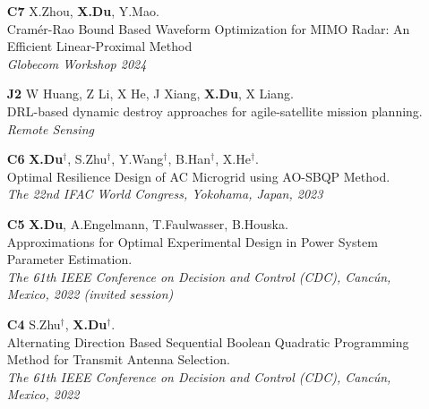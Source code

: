 \documentclass[paper=a4,fontsize=11pt]{scrartcl} %
\begin{document}
\begin{itemize}
		
			\item [\textbf{C7}]   {X.Zhou, \textbf{X.Du},   Y.Mao. \\
				{Cram\'er-Rao Bound Based Waveform Optimization for MIMO Radar: An Efficient Linear-Proximal Method}\\
				\emph{Globecom Workshop 2024
			} }
			
		
			
			
			\item [\textbf{J2}]   {W Huang, Z Li, X He, J Xiang, \textbf{X.Du}, X Liang. \\
				{DRL-based dynamic destroy approaches for agile-satellite mission planning.}\\
				\emph{Remote Sensing\\
			} }
			
			
			\item [\textbf{C6}]   {\textbf{X.Du}$^{\dag}$, S.Zhu$^{\dag}$, Y.Wang$^{\dag}$, B.Han$^{\dag}$, X.He$^{\dag}$. \\
				{Optimal Resilience Design of AC Microgrid using AO-SBQP Method.}\\
				\emph{The 22nd IFAC World Congress, Yokohama, Japan, 2023
			} }
			
			\item [\textbf{C5}]   { \textbf{X.Du}, A.Engelmann, T.Faulwasser, B.Houska. \\
				{Approximations for Optimal Experimental Design
					in Power System Parameter Estimation. }\\
				\emph{ The 61th IEEE Conference on Decision and Control (CDC), Canc\'un, Mexico, 2022 (invited session)
			} }
			
			
			\item [\textbf{C4}]   { S.Zhu$^{\dag}$, \textbf{X.Du}$^{\dag}$. \\
				{Alternating Direction Based Sequential Boolean Quadratic Programming Method for Transmit Antenna Selection.}\\
				\emph{ The 61th IEEE Conference on Decision and Control (CDC), Canc\'un, Mexico, 2022
			} }
			

\end{itemize}
\end{document}
